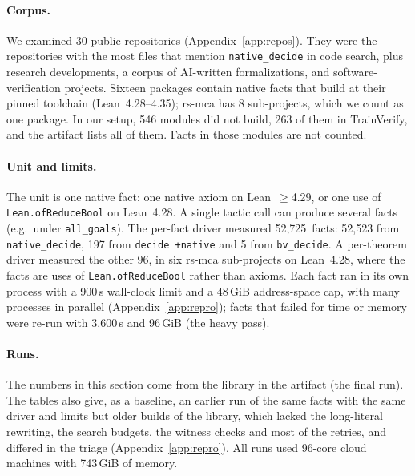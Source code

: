 \documentclass[11pt]{article}
\newcommand{\vperfact}{52,725}   %
\begin{document}
\paragraph{Corpus.} We examined 30 public repositories (Appendix~\ref{app:repos}). They were the
repositories with the most files that mention \texttt{native\_decide} in code search, plus research
developments, a corpus of AI-written formalizations, and software-verification projects. Sixteen
packages contain native facts that build at their pinned toolchain (Lean~4.28--4.35); rs-mca has 8
sub-projects, which we count as one package. In our setup, 546 modules did not build, 263 of them in
TrainVerify, and the artifact lists all of them. Facts in those modules are not counted.

\paragraph{Unit and limits.} The unit is one native fact: one native axiom on Lean~\(\ge\)4.29, or
one use of \texttt{Lean.ofReduceBool} on Lean~4.28. A single tactic call can produce several facts
(e.g.\ under \texttt{all\_goals}). The per-fact driver measured \vperfact\ facts: 52,523 from
\texttt{native\_decide}, 197 from \texttt{decide +native} and 5 from \texttt{bv\_decide}. A
per-theorem driver measured the other 96, in six rs-mca sub-projects on Lean~4.28, where the facts are
uses of \texttt{Lean.ofReduceBool} rather than axioms. Each
fact ran in its own process with a 900\,s wall-clock limit and a 48\,GiB address-space cap, with many
processes in parallel (Appendix~\ref{app:repro}); facts that failed for time or memory were re-run with
3,600\,s and 96\,GiB (the heavy pass).

\paragraph{Runs.} The numbers in this section come from the library in the artifact (the final run). The
tables also give, as a baseline, an earlier run of the same facts with the same driver and limits but older
builds of the library, which lacked the long-literal rewriting, the search budgets, the witness checks and
most of the retries, and differed in the triage (Appendix~\ref{app:repro}). All runs used 96-core cloud
machines with 743\,GiB of memory.
\end{document}
